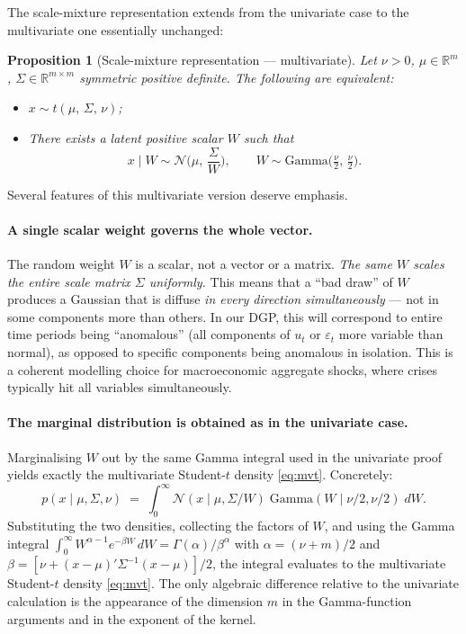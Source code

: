 \documentclass[11pt, a4paper, oneside]{article}
\newtheorem{proposition}{Proposition}
\begin{document}
The scale-mixture representation extends from the univariate case to the
multivariate one essentially unchanged:

\begin{proposition}[Scale-mixture representation — multivariate]
\label{prop:scalemix-multivariate}
Let $\nu > 0$, $\mu \in \mathbb{R}^{m}$, $\Sigma \in \mathbb{R}^{m \times m}$
symmetric positive definite. The following are equivalent:
\begin{itemize}[leftmargin=1.5em]
    \item[(i)] $x \sim t(\mu,\, \Sigma,\, \nu)$;
    \item[(ii)] There exists a latent positive scalar $W$ such that
                \[
                x \mid W \sim \mathcal{N}\!\Big(\mu,\, \frac{\Sigma}{W}\Big),
                \qquad
                W \sim \text{Gamma}\!\big(\tfrac{\nu}{2},\, \tfrac{\nu}{2}\big).
                \]
\end{itemize}
\end{proposition}

Several features of this multivariate version deserve emphasis.

\paragraph{A single scalar weight governs the whole vector.}
The random weight $W$ is a scalar, not a vector or a matrix. \emph{The same
$W$ scales the entire scale matrix $\Sigma$ uniformly.} This means that a
``bad draw'' of $W$ produces a Gaussian that is diffuse \emph{in every
direction simultaneously} — not in some components more than others. In
our DGP, this will correspond to entire time periods being ``anomalous''
(all components of $u_t$ or $\varepsilon_t$ more variable than normal), as
opposed to specific components being anomalous in isolation. This is a
coherent modelling choice for macroeconomic aggregate shocks, where
crises typically hit all variables simultaneously.

\paragraph{The marginal distribution is obtained as in the univariate case.}
Marginalising $W$ out by the same Gamma integral used in the
univariate proof yields exactly the multivariate Student-$t$ density
\eqref{eq:mvt}. Concretely:
\[
p(x \mid \mu, \Sigma, \nu) 
\;=\; \int_0^{\infty} \mathcal{N}(x \mid \mu, \Sigma/W)\; \mathrm{Gamma}(W \mid \nu/2, \nu/2)\; dW.
\]
Substituting the two densities, collecting the factors of $W$, and
using the Gamma integral
$\int_0^{\infty} W^{\alpha - 1} e^{-\beta W}\, dW = \Gamma(\alpha)/\beta^{\alpha}$
with $\alpha = (\nu + m)/2$ and
$\beta = [\nu + (x-\mu)'\Sigma^{-1}(x-\mu)]/2$, the integral evaluates
to the multivariate Student-$t$ density \eqref{eq:mvt}. The only
algebraic difference relative to the univariate calculation is the
appearance of the dimension $m$ in the Gamma-function arguments and
in the exponent of the kernel.
\end{document}
